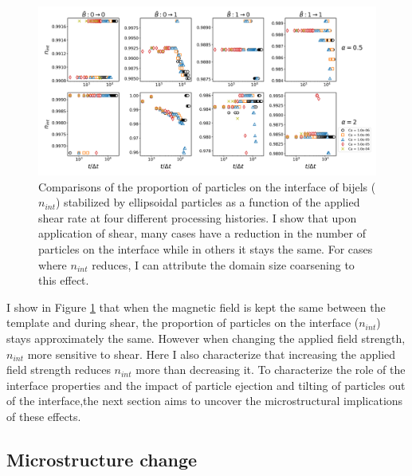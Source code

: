 \begin{figure} 
    \centering 
    \includegraphics[scale=0.3]{../figures/results/paper3/n_int-time_compare.png} 
    \caption{Comparisons of the proportion of particles on the interface of bijels ($n_{int}$) stabilized by ellipsoidal particles as a function of 
             the applied shear rate at four different processing histories. I show that upon application of shear, many cases have a 
             reduction in the number of particles on the interface while in others it stays the same. For cases where $n_{int}$ reduces, I can 
             attribute the domain size coarsening to this effect.} 
    \label{fig:particles_interface_prop_shear} 
\end{figure}

I show in Figure \ref{fig:particles_interface_prop_shear} that when the magnetic field is kept the same between the template and during shear, the
proportion of particles on the interface ($n_{int}$) stays approximately the same. However when changing the applied field strength, $n_{int}$ more 
sensitive to shear. Here I also characterize that increasing the applied field strength reduces $n_{int}$ more than decreasing it. To characterize 
the role of the interface properties and the impact of particle ejection and tilting of particles out of the interface,the next section aims to 
uncover the microstructural implications of these effects.


\subsection{Microstructure change}

